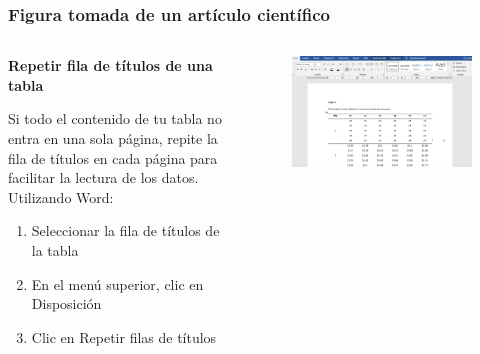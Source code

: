 \documentclass[
11pt, %
]{beamer}
\begin{document}
\begin{frame}
	\frametitle{Figura tomada de un artículo científico}

	\begin{columns}[c] %
		\begin{column}{0.5\textwidth} %
			\textbf{Repetir fila de títulos de una tabla }

			Si todo el contenido de tu tabla no entra en una sola página, repite la fila de
			títulos en cada página para facilitar la lectura de los datos. Utilizando Word:

			\begin{enumerate}
				\item 	Seleccionar la fila de títulos de la tabla
				\item 	En el menú superior, clic en Disposición
				\item 	Clic en Repetir filas de títulos
			\end{enumerate}
		\end{column}
		\begin{column}{0.5\textwidth} %
			\begin{figure}
				\centering
				\includegraphics[width=1\linewidth]{images/screenshot023}
			\end{figure}

		\end{column}
	\end{columns}

\end{frame}
\end{document}
